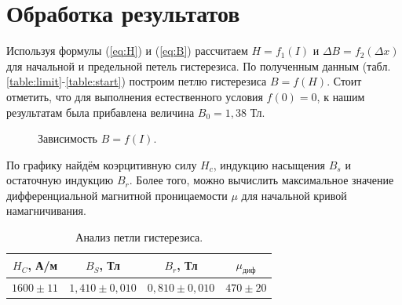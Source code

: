 \documentclass[a4paper,12pt]{article} %
\begin{document}
\section {Обработка результатов}
	Используя формулы (\ref{eq:H}) и (\ref{eq:B}) рассчитаем $H = f_1(I)$ и $\Delta B = f_2 (\Delta x)$ для начальной и предельной петель гистерезиса. По полученным данным (табл.\ref{table:limit}-\ref{table:start}) построим петлю гистерезиса $B = f (H)$. Стоит отметить, что для выполнения естественного условия $f(0) = 0$, к нашим результатам была прибавлена величина $B_0 = 1,38$ Тл. 
	\begin{figure}[H]
		\caption{Зависимость $B = f(I)$.}
		\label{ris:B=f(I)}
	\end{figure}


	По графику найдём коэрцитивную силу $H_c$, индукцию насыщения $B_s$ и остаточную индукцию $B_r$. Более того, можно вычислить максимальное значение дифференциальной магнитной проницаемости $\mu$ для начальной кривой намагничивания.
	\begin{table}[H]
		\caption{Анализ петли гистерезиса.}
		\label{table:result}
		\begin{tabular}{|c|c|c|c|}
			\hline
			$H_C$, А/м   & $B_S$, Тл         & $B_r$, Тл    & $\mu_{диф}$  \\ \hline
			$1600\pm 11$ & $1,410 \pm 0,010$ & $0,810\pm 0,010$ & $470 \pm 20$ \\ \hline
		\end{tabular}
	\end{table}
\end{document}
